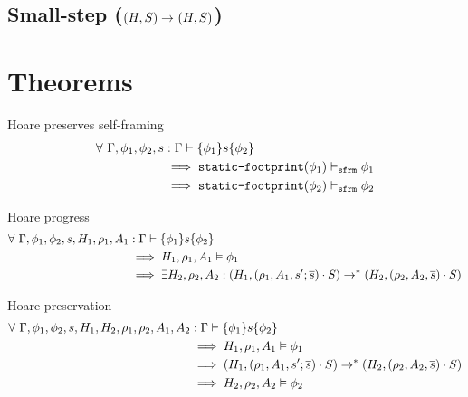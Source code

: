 \documentclass[11pt,a4paper]{article}
\begin{document}
\subsection{Small-step ($\sstep H S H S$)}

\begin{prooftree}
\end{prooftree}\hfill

\begin{prooftree}
\end{prooftree}\hfill

\begin{prooftree}
\end{prooftree}\hfill

\section{Theorems}
Hoare preserves self-framing
\begin{align*}
\forall~ \Gamma, \phi_1, \phi_2, s &: \hoareG {\phi_1} s {\phi_2} 
\\ &\implies \staticFP(\phi_1) \sfrmphi \phi_1 
\\ &\implies \staticFP(\phi_2) \sfrmphi \phi_2
\end{align*}

Hoare progress
\begin{align*}
\forall~ \Gamma, \phi_1, \phi_2, s, H_1, \rho_1, A_1 &: \hoareG {\phi_1} s {\phi_2} 
\\ &\implies \evalphix {H_1} {\rho_1} {A_1} {\phi_1}
\\ &\implies \exists H_2, \rho_2, A_2 : (H_1, (\rho_1, A_1, s' ; \overline{s}) \cdot S)
							\rightarrow^* (H_2, (\rho_2, A_2, \overline{s}) \cdot S)
\end{align*}

Hoare preservation
\begin{align*}
\forall~ \Gamma, \phi_1, \phi_2, s, H_1, H_2, \rho_1, \rho_2, A_1, A_2 &: \hoareG {\phi_1} s {\phi_2} 
\\ &\implies \evalphix {H_1} {\rho_1} {A_1} {\phi_1}
\\ &\implies (H_1, (\rho_1, A_1, s' ; \overline{s}) \cdot S)
  \rightarrow^* (H_2, (\rho_2, A_2, \overline{s}) \cdot S)
\\ &\implies \evalphix {H_2} {\rho_2} {A_2} {\phi_2}
\end{align*}
\end{document}
